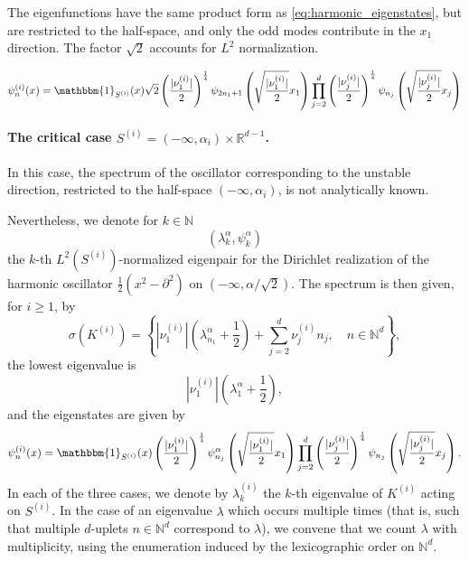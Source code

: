 \documentclass[10pt]{article}
\newcommand{\R}{\mathbb{R}}
\newcommand{\N}{\mathbb N}
\newcommand{\1}{\mathbbm 1}
\begin{document}
    The eigenfunctions have the same product form as \eqref{eq:harmonic_eigenstates}, but are restricted to the half-space, and only the odd modes contribute in the $x_1$ direction. The factor $\sqrt 2$ accounts for $L^2$ normalization.

    \begin{equation}
        \label{eq:harmonic_eigenstates_half_space}
        \psi^{(i)}_n(x) = \mathbbm{1}_{S^{(i)}}(x)\sqrt 2\left(\frac{|\nu_1^{(i)}|}{2}\right)^{\frac14}\psi_{2n_1+1}\left(\sqrt{\frac{|\nu^{(i)}_1|}2}x_1\right)\prod_{j=2}^d  \left(\frac{|\nu_j^{(i)}|}{2}\right)^{\frac14}\psi_{n_j}\left(\sqrt{\frac{|\nu^{(i)}_j|}2}x_j\right)
    \end{equation}

    \paragraph{The critical case $S^{(i)} = (-\infty,\alpha_i) \times \R^{d-1}$.\newline}
        In this case, the spectrum of the oscillator corresponding to the unstable direction, restricted to the half-space $(-\infty,\alpha_i)$, is not analytically known.

        Nevertheless, we denote for $k\in\N$
        $$(\lambda_k^{\alpha},\psi_k^{\alpha})$$
        the $k$-th $L^2(S^{(i)})$-normalized eigenpair for the Dirichlet realization of the harmonic oscillator $\frac12\left(x^2-\partial^2\right)$ on $(-\infty,\alpha/\sqrt 2)$.
        The spectrum is then given, for $i\geq 1$, by
        $$\sigma(K^{(i)}) = \left\{ |\nu_1^{(i)}|(\lambda_{n_1}^{\alpha} + \frac12) + \sum_{j=2}^d \nu_j^{(i)}n_j,\quad n\in\N^d\right\},$$
        the lowest eigenvalue is
        $$|\nu_1^{(i)}|\left(\lambda_{1}^{\alpha}+\frac12\right),$$
        and the eigenstates are given by
        $$\psi^{(i)}_n(x) = \mathbbm{1}_{S^{(i)}}(x)\left(\frac{|\nu_1^{(i)}|}{2}\right)^{\frac14}\psi_{n_j}^{\alpha}\left(\sqrt{\frac{|\nu^{(i)}_1|}2}x_1\right)\prod_{j=2}^d  \left(\frac{|\nu_j^{(i)}|}{2}\right)^{\frac14}\psi_{n_j}\left(\sqrt{\frac{|\nu^{(i)}_j|}2}x_j\right).$$
    In each of the three cases, we denote by $\lambda_k^{(i)}$ the $k$-th eigenvalue of $K^{(i)}$ acting on $S^{(i)}$. In the case of an eigenvalue $\lambda$ which occurs multiple times (that is, such that multiple $d$-uplets $n\in\N^d$ correspond to $\lambda$), we convene that we count $\lambda$ with multiplicity, using the enumeration induced by the lexicographic order on $\N^d$. 
\end{document}
